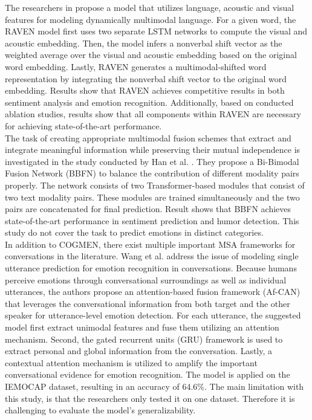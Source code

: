 The researchers in \cite{Wang2018} propose a model that utilizes language, acoustic and visual features for modeling dynamically multimodal language. For a given word, the RAVEN model first uses two separate LSTM networks to compute the visual and acoustic embedding. Then, the model infers a nonverbal shift vector as the weighted average  over the visual and acoustic embedding based on the original word embedding. Lastly, RAVEN generates a  multimodal-shifted word representation by integrating the nonverbal shift vector to the original word embedding. Results show that RAVEN achieves competitive results in both sentiment analysis and emotion recognition. Additionally, based on conducted ablation studies, results show that all components within RAVEN are necessary for achieving state-of-the-art performance. \\

The task of creating appropriate multimodal fusion schemes that extract and integrate meaningful information while preserving their mutual independence is investigated in the study conducted by Han et al. \cite{bimodal-fusion1-10.1145/3462244.3479919}. They propose a Bi-Bimodal Fusion Network (BBFN) to balance the contribution of different modality pairs properly. The network consists of two Transformer-based modules that consist of two text modality pairs. These modules are trained simultaneously and the two pairs are concatenated for final prediction. Result shows that BBFN achieves state-of-the-art performance in sentiment prediction and humor detection. This study do not cover the task to predict emotions in distinct categories.  \\

In addition to COGMEN, there exist multiple important MSA frameworks for conversations in the literature. Wang et al. \cite{Af-CAN_2021} address the issue of modeling single utterance prediction for emotion recognition in conversations. Because humans perceive emotions through conversational surroundings as well as individual utterances, the authors propose an attention-based fusion framework (Af-CAN) that leverages the conversational information from both target and the other speaker for utterance-level emotion detection. For each utterance, the suggested model first extract unimodal features and fuse them utilizing an attention mechanism. Second, the gated recurrent units (GRU) framework is used to extract personal and global information from the conversation. Lastly, a contextual attention mechanism is utilized to amplify the important conversational evidence for emotion recognition. The model is applied on the IEMOCAP dataset, resulting in an accuracy of 64.6\%. The main limitation with this study, is that the researchers only tested it on one dataset. Therefore it is challenging to evaluate the model's generalizability. \\

